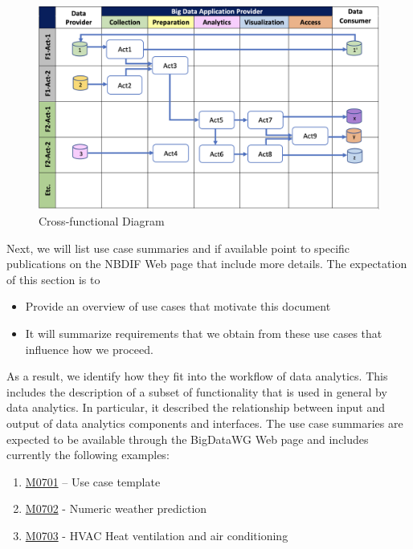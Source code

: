 \begin{figure}[htb]
    \centering
    \includegraphics[width=1.0\columnwidth]{images/cross-functional-diagram.png}
    \caption{Cross-functional Diagram}
    \label{fig:cross-functional-diagram}
\end{figure}


Next, we will list use case summaries and if available point to specific publications on the NBDIF Web page that include more details. The expectation of this section is to
 
\begin{itemize}
\item	Provide an overview of use cases that motivate this document
\item	It will summarize requirements that we obtain from these use cases that influence how we proceed.
\end{itemize}

As a result, we identify how they fit into the workflow of data analytics. This includes the description of a subset of functionality that is used in general by data analytics.  In particular, it described the relationship between input and output of data analytics components and interfaces.  The use case summaries are expected to be available through the BigDataWG Web page and includes currently the following examples:

\begin{enumerate}
\item	\href{https://bigdatawg.nist.gov/_uploadfiles/M0701_v1_2020102001.docx}{M0701} – Use case template \cite{nist-usecase-template}
\item	\href{https://bigdatawg.nist.gov/_uploadfiles/M0702_v1_2020102002.pdf}{M0702} - Numeric weather prediction \cite{nist-wrf}
\item	\href{https://bigdatawg.nist.gov/_uploadfiles/M0703_v1_2020102003.pdf}{M0703} - HVAC Heat ventilation and air conditioning \cite{nist-hvac}
\end{enumerate}





